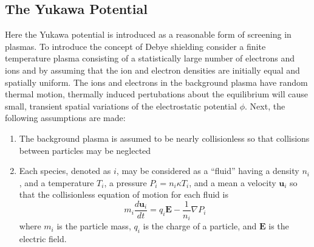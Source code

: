 \subsection{The Yukawa Potential}
Here the Yukawa potential is introduced as a reasonable form of screening in plasmas. To introduce the concept of Debye shielding consider a finite temperature plasma consisting of a statistically large number of electrons and ions and by assuming that the ion and electron densities are initially equal and spatially uniform. The ions and electrons in the background plasma have random thermal motion, thermally induced pertubations about the equilibrium will cause small, transient spatial variations of the electrostatic potential $\phi$. Next, the following assumptions are made:
\begin{enumerate}
    \item The background plasma is assumed to be nearly collisionless so that collisions between particles may be neglected
    \item Each species, denoted as $i$, may be considered as a ``fluid'' having a density $n_i$, and a temperature $T_i$, a pressure $P_i = n_i \kappa T_i$, and a mean a velocity $\boldsymbol{u}_i$ so that the collisionless equation of motion for each fluid is
    \begin{equation} \label{eqn:collisionless-motion}
        m_i \dfrac{d \boldsymbol{u}_i}{dt} = q_i \boldsymbol{E} - \dfrac{1}{n_i} \nabla P_i
    \end{equation}
    where $m_i$ is the particle mass, $q_i$ is the charge of a particle, and $\boldsymbol{E}$ is the electric field.
\end{enumerate}

